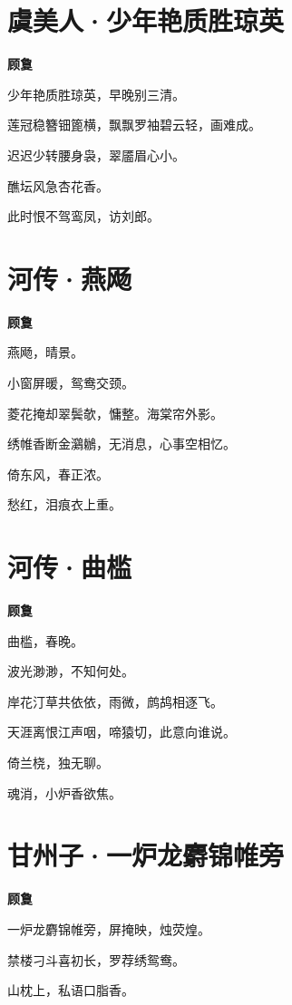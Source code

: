 \documentclass[12pt,a4paper]{ctexbook}
\begin{document}
\section{虞美人·少年艳质胜琼英}
\textbf{顾敻}\par\vspace{0.5em}
少年艳质胜琼英，早晚别三清。\par
莲冠稳簪钿篦横，飘飘罗袖碧云轻，画难成。\par
迟迟少转腰身袅，翠靥眉心小。\par
醮坛风急杏花香。\par
此时恨不驾鸾凤，访刘郎。\par

\section{河传·燕飏}
\textbf{顾敻}\par\vspace{0.5em}
燕飏，晴景。\par
小窗屏暖，鸳鸯交颈。\par
菱花掩却翠鬓欹，慵整。海棠帘外影。\par
绣帷香断金鸂鶒，无消息，心事空相忆。\par
倚东风，春正浓。\par
愁红，泪痕衣上重。\par

\section{河传·曲槛}
\textbf{顾敻}\par\vspace{0.5em}
曲槛，春晚。\par
波光渺渺，不知何处。\par
岸花汀草共依依，雨微，鹧鸪相逐飞。\par
天涯离恨江声咽，啼猿切，此意向谁说。\par
倚兰桡，独无聊。\par
魂消，小炉香欲焦。\par

\section{甘州子·一炉龙麝锦帷旁}
\textbf{顾敻}\par\vspace{0.5em}
一炉龙麝锦帷旁，屏掩映，烛荧煌。\par
禁楼刁斗喜初长，罗荐绣鸳鸯。\par
山枕上，私语口脂香。\par
\end{document}
